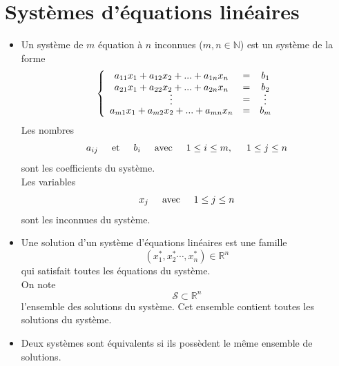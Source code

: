 \documentclass[12pt,a4paper]{article}
\renewcommand{\vdots}{\rotatebox[origin=c]{90}{\(\cdots\)}}
\begin{document}
\newpage
\section{Systèmes d'équations linéaires}
\begin{itemize}[label=$\bullet$]
    \item Un \colorbox{def!40}{système} de $m$ \colorbox{def!40}{équation} à $n$ \colorbox{def!40}{inconnues} ($m,n\in\mathbb{N}$) est un système de la forme
    \[\left\{\begin{array}{ccc} a_{11}x_1+a_{12}x_2+...+a_{1n}x_n &=& b_1\\a_{21}x_1+a_{22}x_2+...+a_{2n}x_n &=& b_2 \\ \vdots &=& \vdots \\ a_{m1}x_1+a_{m2}x_2+...+a_{mn}x_n &=& b_m\end{array}\right.\]
Les nombres $$a_{ij}\hspace{0.5cm}\text{et}\hspace{0.5cm} b_i\hspace{0.5cm}\text{avec} \hspace{0.5cm} 1\leq i\leq m,\hspace{0.5cm}  1\leq j\leq n$$ sont les \colorbox{def!40}{coefficients} du système.
\\
Les variables 
\[
x_j \hspace{0.5cm} \text{avec} \hspace{0.5cm} 1\leq j\leq n
\]
sont les \colorbox{def!40}{inconnues} du système.
\item Une \colorbox{def!40}{solution} d'un système d'équations linéaires est une famille 
\[
(x_1^*,x_2^*\cdots,x_n^*)\in\mathbb{R}^n
\]
qui satisfait toutes les équations du système.
\\
On note 
\[
\mathcal{S} \subset \mathbb{R}^n
\]
l'\colorbox{def!40}{ensemble des solutions} du système. Cet ensemble contient toutes les solutions du système.
\item Deux systèmes sont \colorbox{def!40}{équivalents} si ils possèdent le même ensemble de solutions.
\end{itemize}

\newpage
\end{document}

